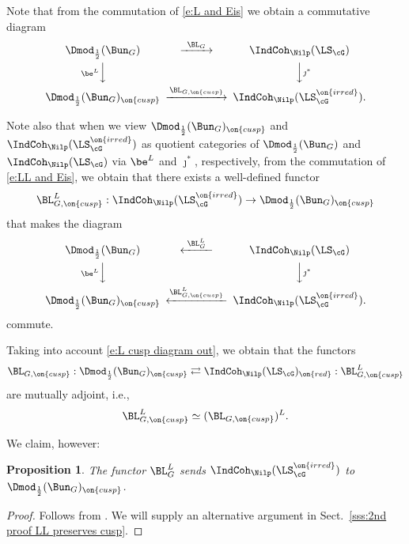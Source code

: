 \documentclass[9pt]{amsart}
\newtheorem{prop}[subsubsection]{Proposition}
\theoremstyle{remark}
\theoremstyle{definition}
\theoremstyle{remark}
\newcommand{\secref}[1]{Sect.~\ref{#1}}
\numberwithin{equation}{section}
\begin{document}
\medskip

Note that from the commutation of \eqref{e:L and Eis} we obtain a commutative diagram
\begin{equation} \label{e:L cusp diagram out}
\CD
\Dmod_{\frac{1}{2}}(\Bun_G) @>{\BL_G}>> \IndCoh_\Nilp(\LS_\cG) \\
@V{\be^L}VV @VV{\jmath^*}V  \\
\Dmod_{\frac{1}{2}}(\Bun_G)_{\on{cusp}} @>{\BL_{G,\on{cusp}}}>>  \IndCoh_\Nilp(\LS^{\on{irred}}_\cG).
\endCD
\end{equation} 

\sssec{}

Note also that when we view $\Dmod_{\frac{1}{2}}(\Bun_G)_{\on{cusp}}$ and $\IndCoh_\Nilp(\LS^{\on{irred}}_\cG)$
as quotient categories of $\Dmod_{\frac{1}{2}}(\Bun_G)$ and $\IndCoh_\Nilp(\LS_\cG)$ via $\be^L$ and $\jmath^*$, respectively, from
the commutation of \eqref{e:LL and Eis}, we obtain that there exists a well-defined functor
$$\BL^L_{G,\on{cusp}}:\IndCoh_\Nilp(\LS^{\on{irred}}_\cG)\to \Dmod_{\frac{1}{2}}(\Bun_G)_{\on{cusp}}$$
that makes the diagram 
\begin{equation} \label{e:LL cusp diagram out}
\CD
\Dmod_{\frac{1}{2}}(\Bun_G) @<{\BL^L_G}<< \IndCoh_\Nilp(\LS_\cG) \\
@V{\be^L}VV @VV{\jmath^*}V \\
\Dmod_{\frac{1}{2}}(\Bun_G)_{\on{cusp}} @<{\BL^L_{G,\on{cusp}}}<<  \IndCoh_\Nilp(\LS^{\on{irred}}_\cG).
\endCD
\end{equation} 
commute. 

\medskip

Taking into account \eqref{e:L cusp diagram out}, we obtain that the functors
\begin{equation} \label{e:L and LL on cusp}
\BL_{G,\on{cusp}}:\Dmod_{\frac{1}{2}}(\Bun_G)_{\on{cusp}}\rightleftarrows \IndCoh_\Nilp(\LS_\cG)_{\on{red}}:\BL^L_{G,\on{cusp}}
\end{equation}
are mutually adjoint, i.e.,
$$\BL^L_{G,\on{cusp}}\simeq (\BL_{G,\on{cusp}})^L.$$

\sssec{}

We claim, however:  

\begin{prop} \label{p:LL preserves cusp}
The functor $\BL^L_G$ sends $\IndCoh_\Nilp(\LS^{\on{irred}}_\cG)$ to $\Dmod_{\frac{1}{2}}(\Bun_G)_{\on{cusp}}$.
\end{prop}

\begin{proof}

Follows from \cite[Proposition 17.2.2]{GLC2}. We will supply an alternative argument in \secref{sss:2nd proof LL preserves cusp}.

\end{proof} 
\end{document}
